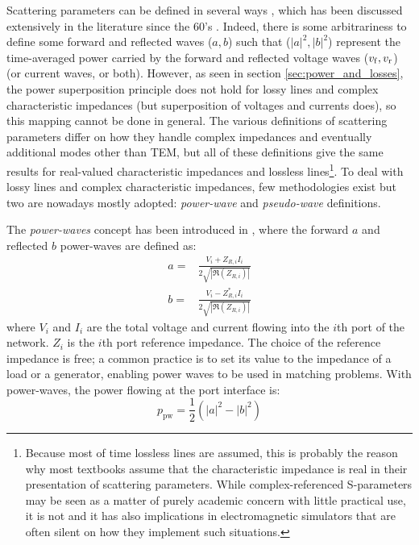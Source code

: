 Scattering parameters can be defined in several ways , which has been discussed extensively in the literature since the 60's \cite{carlin1956, kurokawa1965, woods1972, marks1992, williams2013, amakawa2016}. Indeed, there is some arbitrariness to define some forward and reflected waves ($a, b$) such that ($|a|^2, |b|^2$) represent the time-averaged power carried by the forward and reflected voltage waves (${v_{\mathrm{f}}}, {v_{\mathrm{r}}}$) (or current waves, or both). However, as seen in section \ref{sec:power_and_losses}, the power superposition principle does not hold for lossy lines and complex characteristic impedances (but superposition of voltages and currents does), so this mapping cannot be done in general. The various definitions of scattering parameters differ on how they handle complex impedances and eventually additional modes other than TEM, but all of these definitions give the same results for real-valued characteristic impedances and lossless lines\footnote{Because most of time lossless lines are assumed, this is probably the reason why most textbooks assume that the characteristic impedance is real in their presentation of scattering parameters. While complex-referenced S-parameters may be seen as a matter of purely academic concern with little practical use, it is not and it has also implications in electromagnetic simulators that are often silent on how they implement such situations.}. To deal with lossy lines and complex characteristic impedances, few methodologies exist but two are nowadays mostly adopted: \textit{power-wave} and \textit{pseudo-wave}  definitions. 

The \textit{power-waves} concept has been introduced in , where the forward $a$ and reflected $b$ power-waves are defined as:
\begin{subequations}
\begin{align}
	a =& \frac{V_i + Z_{R,i} I_i}{2\sqrt{|\Re(Z_{R,i})|}} \\
	b =& \frac{V_i - Z_{R,i}^* I_i}{2\sqrt{|\Re(Z_{R,i})|}}
\end{align}
\label{eq:power-waves_definition}
\end{subequations}
where $V_i$ and $I_i$ are the total voltage and current flowing into the $i$th port of the network. $Z_{i}$ is the $i$th port reference impedance. The choice of the reference impedance is free; a common practice is to set its value to the impedance of a load or a generator, enabling power waves to be used in matching problems. With power-waves, the power flowing at the port interface is:
\begin{equation}
	p_{\mathrm{pw}} = \frac{1}{2} \left( |a|^2 - |b|^2 \right)
\end{equation}

